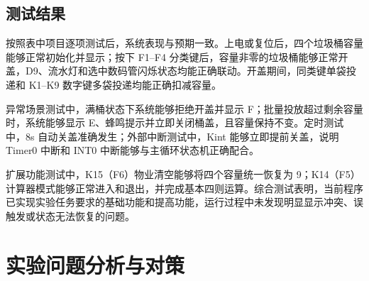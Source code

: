 \documentclass[12pt,a4paper]{article}
\begin{document}
\subsection{测试结果}
按照表中项目逐项测试后，系统表现与预期一致。上电或复位后，四个垃圾桶容量能够正常初始化并显示；按下 F1--F4 分类键后，容量非零的垃圾桶能够正常开盖，D9、流水灯和选中数码管闪烁状态均能正确联动。开盖期间，同类键单袋投递和 K1--K9 数字键多袋投递均能正确扣减容量。

异常场景测试中，满桶状态下系统能够拒绝开盖并显示 F；批量投放超过剩余容量时，系统能够显示 E、蜂鸣提示并立即关闭桶盖，且容量保持不变。定时测试中，8s 自动关盖准确发生；外部中断测试中，Kint 能够立即提前关盖，说明 Timer0 中断和 INT0 中断能够与主循环状态机正确配合。

扩展功能测试中，K15（F6）物业清空能够将四个容量统一恢复为 9；K14（F5）计算器模式能够正常进入和退出，并完成基本四则运算。综合测试表明，当前程序已实现实验任务要求的基础功能和提高功能，运行过程中未发现明显显示冲突、误触发或状态无法恢复的问题。




\section{实验问题分析与对策}
\end{document}
